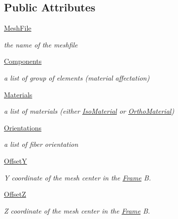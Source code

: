 \subsection*{Public Attributes}
\begin{DoxyCompactItemize}
\item 
\hyperlink{classgebtaero_1_1_external_mesh_1_1_external_mesh_a53b38c75b026fb6c56b50b2dd9b5270f}{Mesh\+File}
\begin{DoxyCompactList}\small\item\em the name of the meshfile \end{DoxyCompactList}\item 
\hyperlink{classgebtaero_1_1_external_mesh_1_1_external_mesh_a592c0deea81b1ba0e686add0943889b4}{Components}
\begin{DoxyCompactList}\small\item\em a list of group of elements (material affectation) \end{DoxyCompactList}\item 
\hyperlink{classgebtaero_1_1_external_mesh_1_1_external_mesh_a60dc1666f258188383bc1a172bb3d219}{Materials}
\begin{DoxyCompactList}\small\item\em a list of materials (either \hyperlink{namespacegebtaero_1_1_iso_material}{Iso\+Material} or \hyperlink{namespacegebtaero_1_1_ortho_material}{Ortho\+Material}) \end{DoxyCompactList}\item 
\hyperlink{classgebtaero_1_1_external_mesh_1_1_external_mesh_a531dc1641becd6ea9cc5225ddfea8752}{Orientations}
\begin{DoxyCompactList}\small\item\em a list of fiber orientation \end{DoxyCompactList}\item 
\hyperlink{classgebtaero_1_1_external_mesh_1_1_external_mesh_a87faefe634a474727d516e58eb8bf944}{OffsetY}
\begin{DoxyCompactList}\small\item\em Y coordinate of the mesh center in the \hyperlink{namespacegebtaero_1_1_frame}{Frame} B. \end{DoxyCompactList}\item 
\hyperlink{classgebtaero_1_1_external_mesh_1_1_external_mesh_a6639038ee73b225cf0d3ea1bd9c52783}{OffsetZ}
\begin{DoxyCompactList}\small\item\em Z coordinate of the mesh center in the \hyperlink{namespacegebtaero_1_1_frame}{Frame} B. \end{DoxyCompactList}\item 

\end{DoxyCompactItemize}
